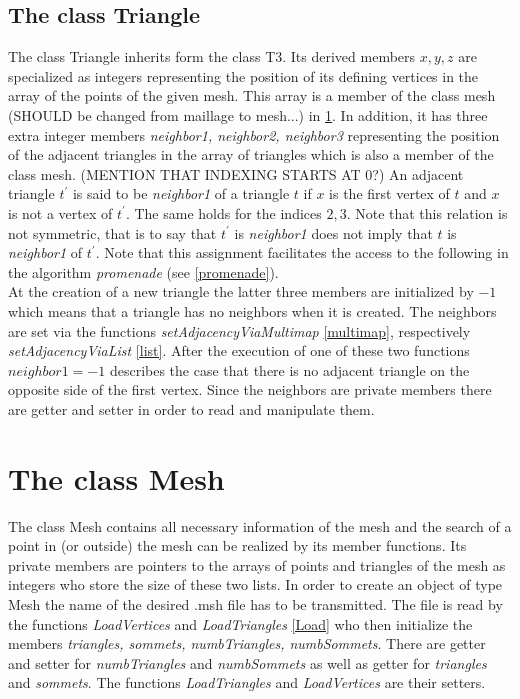 \documentclass[10pt]{article}
\begin{document}
\subsection{The class Triangle} \label{triangle}
The class Triangle inherits form the class T3. Its derived members $ x,y,z $ are specialized as integers representing the position of its defining vertices in the array of the points of the given mesh. This array is a member of the class mesh (SHOULD be changed from maillage to mesh...) in \ref{mesh}. In addition, it has three extra integer members {\itshape neighbor1, neighbor2, neighbor3} representing the position of the adjacent triangles in the array of triangles which is also a member of the class mesh. (MENTION THAT INDEXING STARTS AT 0?) An adjacent triangle $ t^{'} $ is said to be  {\itshape neighbor1 } of a triangle $ t $ if $ x $ is the first vertex of $t$ and $x$ is not a vertex of $ t^{'} $. The same holds for the indices $ 2,3 $. Note that this relation is not symmetric, that is to say that $ t^{'} $ is {\itshape neighbor1} does not imply that $t$ is {\itshape neighbor1} of $t^{'}$. 
Note that this assignment facilitates the access to the following in the algorithm {\itshape promenade} (see \ref{promenade}).  \\
At the creation of a new triangle the latter three members are initialized by $ -1 $ which means that a triangle has no neighbors when it is created. The neighbors are set via the functions {\itshape setAdjacencyViaMultimap} \ref{multimap}, respectively {\itshape setAdjacencyViaList} \ref{list}. After the execution of one of these two functions $neighbor1 =  -1 $ describes the case that there is no adjacent triangle on the opposite side of the first vertex. 
Since the neighbors are private members there are getter and setter in order to read and manipulate them. \\



\section{The class Mesh} \label{mesh}
The class Mesh contains all necessary information of the mesh and the search of a point in (or outside) the mesh can be realized by its member functions. Its private members are pointers to the arrays of points and triangles of the mesh as integers who store the size of these two lists.
In order to create an object of type Mesh the name of the desired .msh file has to be transmitted. The file is read by the functions {\itshape LoadVertices} and {\itshape LoadTriangles} \ref{Load} who then initialize the members {\itshape triangles, sommets, numbTriangles, numbSommets}. 
There are getter and setter for {\itshape numbTriangles} and {\itshape numbSommets} as well as getter for {\itshape triangles} and {\itshape sommets}. The functions {\itshape LoadTriangles} and {\itshape LoadVertices} are their setters. \\
\end{document}
